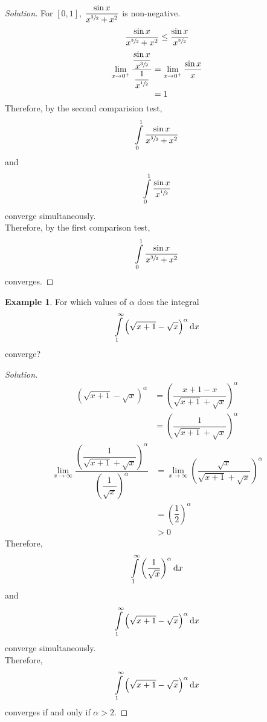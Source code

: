 \documentclass[fleqn, 12pt]{article}
\theoremstyle{definition}
\newtheorem{example}{Example}
\theoremstyle{theorem}
\newenvironment{solution}
{\begin{proof}[Solution]\let\qed\relax}
	{\end{proof}}
\begin{document}
\begin{solution}
	For $[0,1]$, $\dfrac{\sin x}{x^{\sfrac{3}{2}} + x^2}$ is non-negative.
	\begin{align*}
		\dfrac{\sin x}{x^{\sfrac{3}{2}} + x^2} \leq \dfrac{\sin x}{x^{\sfrac{3}{2}}}
	\end{align*}
	\begin{align*}
		\lim\limits_{x \to 0^+} \dfrac{\dfrac{\sin x}{x^{\sfrac{3}{2}}}}{\dfrac{1}{x^{\sfrac{1}{2}}}} &= \lim\limits_{x \to 0^+} \dfrac{\sin x}{x}\\
		&= 1
	\end{align*}
	Therefore, by the second comparision test, \[\int\limits_{0}^{1} \dfrac{\sin x}{x^{\sfrac{3}{2}} + x^2}\] and \[\int\limits_{0}^{1} \dfrac{\sin x}{x^{\sfrac{1}{2}}}\] converge simultaneously.\\
	Therefore, by the first comparison test, \[\int\limits_{0}^{1} \dfrac{\sin x}{x^{\sfrac{3}{2}} + x^2}\] converges.
\end{solution}

\begin{example}
	For which values of $\alpha$ does the integral \[\int\limits_{1}^{\infty} \left( \sqrt{x + 1} - \sqrt{x} \right)^{\alpha} \dif x\] converge?
\end{example}

\begin{solution}
	\begin{align*}
		\left( \sqrt{x + 1} - \sqrt{x} \right)^{\alpha} &= \left( \dfrac{x + 1 - x}{\sqrt{x + 1} + \sqrt{x}} \right)^{\alpha}\\
		&= \left( \dfrac{1}{\sqrt{x + 1} + \sqrt{x}} \right)^{\alpha}
	\end{align*}
	\begin{align*}
		\lim\limits_{x \to \infty} \dfrac{\left( \dfrac{1}{\sqrt{x + 1} + \sqrt{x}} \right)^{\alpha}}{\left( \dfrac{1}{\sqrt{x}} \right)^{\alpha}} &= \lim\limits_{x \to \infty} \left( \dfrac{\sqrt{x}}{\sqrt{x + 1} + \sqrt{x}} \right)^{\alpha}\\
		&= \left( \dfrac{1}{2} \right)^{\alpha}\\
		&> 0		
	\end{align*}
	Therefore, \[\int\limits_{1}^{\infty} \left( \dfrac{1}{\sqrt{x}} \right)^\alpha \dif x\] and \[\int\limits_{1}^{\infty} \left( \sqrt{x + 1} - \sqrt{x} \right)^{\alpha} \dif x\] converge simultaneously.\\
	Therefore, \[\int\limits_{1}^{\infty} \left( \sqrt{x + 1} - \sqrt{x} \right)^{\alpha} \dif x\] converges if and only if $\alpha > 2$.
\end{solution}
\end{document}
